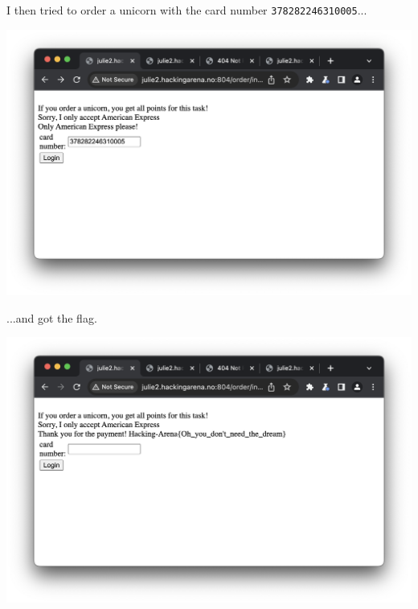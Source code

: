 I then tried to order a unicorn with the card number \texttt{378282246310005}...

\begin{center}
    \includegraphics[width=15cm]{img/Web hacking/Order a Unicorn/Screenshot 2023-11-24 at 12.55.22.png}
\end{center}

...and got the flag.

\begin{center}
    \includegraphics[width=15cm]{img/Web hacking/Order a Unicorn/Screenshot 2023-11-24 at 12.55.26.png}
\end{center}